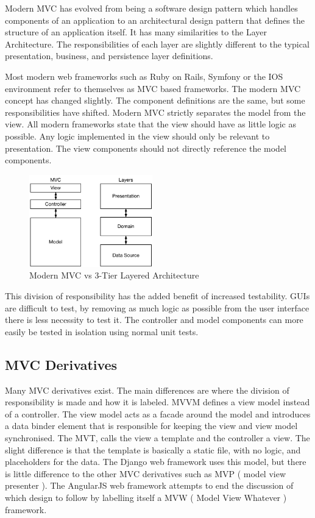 Modern MVC has evolved from being a software design pattern which handles components of an application to an architectural design pattern that defines the structure of an application itself. It has many similarities to the Layer Architecture. The responsibilities of each layer are slightly different to the typical presentation, business, and persistence layer definitions.

Most modern web frameworks such as Ruby on Rails, Symfony or the IOS environment refer to themselves as MVC based frameworks. The modern MVC concept has changed slightly. The component definitions are the same, but some responsibilities have shifted. Modern MVC strictly separates the model from the view. All modern frameworks state that the view should have as little logic as possible. Any logic implemented in the view should only be relevant to presentation. The view components should not directly reference the model components\cite{apple_MVC}\cite{symfony_MVC}.

\begin{figure}[H]
    \centering
    \includegraphics[height=4cm,keepaspectratio]{assets/concept/mvc_2.pdf}
    \caption{Modern MVC vs 3-Tier Layered Architecture}
    \label{fig:mvc_2}
\end{figure}

This division of responsibility has the added benefit of increased testability. GUIs are difficult to test, by removing as much logic as possible from the user interface there is less necessity to test it. The controller and model components can more easily be tested in isolation using normal unit tests\cite{mvp_testing}.

\subsection{MVC Derivatives}

Many MVC derivatives exist. The main differences are where the division of responsibility is made and how it is labeled. MVVM defines a view model instead of a controller. The view model acts as a facade around the model and introduces a data binder element that is responsible for keeping the view and view model synchronised. The MVT, calls the view a template and the controller a view. The slight difference is that the template is basically a static file, with no logic, and placeholders for the data. The Django web framework uses this model, but there is little difference to the other MVC derivatives such as MVP ( model view presenter ). The AngularJS web framework attempts to end the discussion of which design to follow by labelling itself a MVW ( Model View Whatever ) framework\cite{mvw}.


